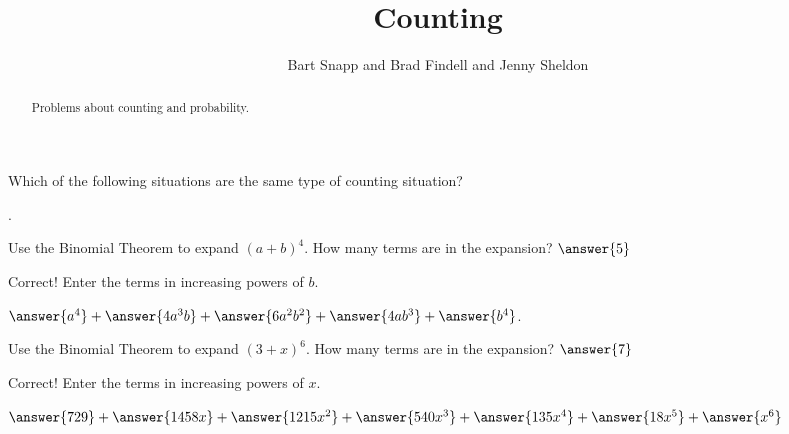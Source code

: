 \documentclass[nooutcomes]{ximera}
\title{Counting}
\author{Bart Snapp and Brad Findell and Jenny Sheldon}
\begin{document}
\begin{abstract}
Problems about counting and probability.
\end{abstract}
\maketitle




\begin{problem}
	Which of the following situations are the same type of counting situation?
	
	\begin{selectAll}
		. 
	\end{selectAll}
\end{problem}


\begin{problem}
Use the Binomial Theorem to expand $(a+b)^4$.  How many terms are in the expansion?  $\answer{5}$
\begin{problem}
Correct!  Enter the terms in increasing powers of $b$.  

\begin{prompt}
 $\answer{a^4}+\answer{4a^3b}+\answer{6a^2b^2}+\answer{4ab^3}+\answer{b^4}$. %
\end{prompt}
\end{problem}
\end{problem}


\begin{problem}
Use the Binomial Theorem to expand $(3+x)^6$.  How many terms are in the expansion?  $\answer{7}$
\begin{problem}
Correct!  Enter the terms in increasing powers of $x$.  

\begin{prompt}
 $\answer{729}+\answer{1458x}+\answer{1215x^2}+\answer{540x^3}+\answer{135x^4}+\answer{18x^5}+\answer{x^6}$  %
\end{prompt}
\end{problem}
\end{problem}
\end{document}

